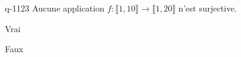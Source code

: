 \begin{truefalse}{q-1123}
Aucune application $f : \llbracket 1, 10 \rrbracket \to \llbracket 1, 20 \rrbracket$ n'est surjective.
\item* Vrai
\item Faux
\end{truefalse}

